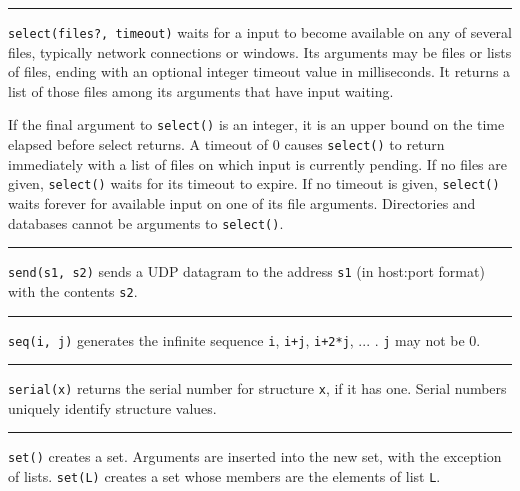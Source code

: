 \bigskip\hrule\vspace{0.1cm}

\noindent
\texttt{select(files?, timeout)} waits for a input to become available
on any of several files, typically network connections or windows. Its
arguments may be files or lists of files, ending with an optional
integer timeout value in milliseconds. It returns a list of those files
among its arguments that have input waiting.

If the final argument to \texttt{select()} is an
integer, it is an upper bound on the time elapsed before select
returns. A timeout of 0 causes \texttt{select()} to return immediately
with a list of files on which input is currently pending. If no files
are given, \texttt{select()} waits for its timeout to expire. If no
timeout is given, \texttt{select()} waits forever for available input
on one of its file arguments. Directories and databases cannot be
arguments to \texttt{select()}.

\bigskip\hrule\vspace{0.1cm}

\noindent
{}\texttt{send(s1, s2)} sends a UDP datagram to the
address \texttt{s1} (in host:port format) with the contents
\texttt{s2}.

\bigskip\hrule\vspace{0.1cm}

\noindent
{}\texttt{seq(i, j)} generates the
infinite sequence \texttt{i}, \texttt{i+j}, \texttt{i+2*j}, ... .
\texttt{j} may not be 0.

\bigskip\hrule\vspace{0.1cm}

\noindent
{}\texttt{serial(x)} returns the serial number for
structure \texttt{x}, if it has one. Serial numbers uniquely identify
structure values.

\bigskip\hrule\vspace{0.1cm}

\noindent
{}\texttt{set()} creates a set. Arguments
are inserted into the new set, with the exception of lists.
\texttt{set(L)} creates a set whose members are the elements of list
\texttt{L}.

